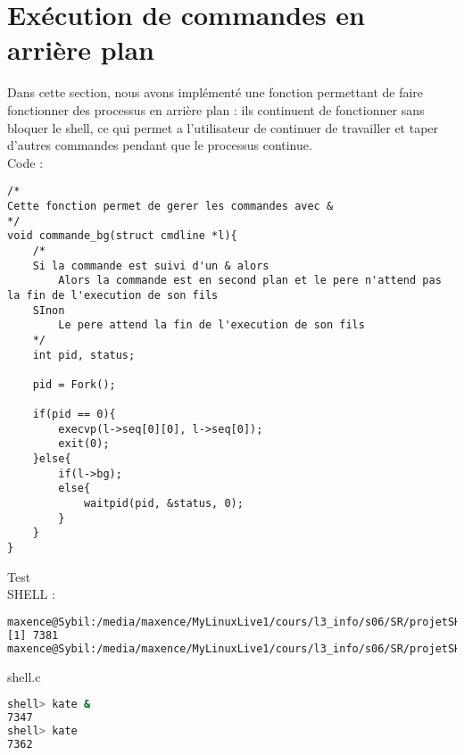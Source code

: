 \documentclass{report}
\begin{document}
		\section{Ex\'ecution de commandes en arri\`ere plan}
			Dans cette section, nous avons impl\'ement\'e une fonction permettant de faire fonctionner des processus en arri\`ere plan : ils continuent de fonctionner sans bloquer le shell, ce qui permet a l'utilisateur de continuer de travailler et taper d'autres commandes pendant que le processus continue.\\Code :
			\begin{lstlisting}
/*
Cette fonction permet de gerer les commandes avec &
*/
void commande_bg(struct cmdline *l){
	/*
	Si la commande est suivi d'un & alors
		Alors la commande est en second plan et le pere n'attend pas la fin de l'execution de son fils
	SInon
		Le pere attend la fin de l'execution de son fils
	*/ 
	int pid, status;

	pid = Fork();

	if(pid == 0){
		execvp(l->seq[0][0], l->seq[0]);
		exit(0);
	}else{
		if(l->bg);
		else{
			waitpid(pid, &status, 0);
		}
	}
}
	\end{lstlisting}			
	Test \\ SHELL :
	\begin{lstlisting}[frame=single,basicstyle=\footnotesize,language=bash]
maxence@Sybil:/media/maxence/MyLinuxLive1/cours/l3_info/s06/SR/projetSHELL$ kate &
[1] 7381
maxence@Sybil:/media/maxence/MyLinuxLive1/cours/l3_info/s06/SR/projetSHELL$ kate

			\end{lstlisting}
			shell.c
			\begin{lstlisting}[frame=single,basicstyle=\footnotesize,language=bash]
shell> kate &
7347
shell> kate
7362

			\end{lstlisting}
\end{document}
